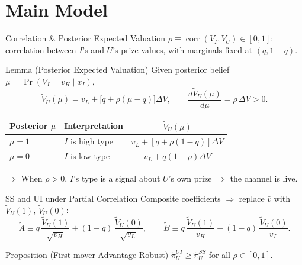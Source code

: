 \documentclass[aspectratio=169, 12pt]{beamer}
\newcommand{\VU}{\widetilde V_U}
\begin{document}
\section{Main Model}

\begin{frame}{Correlation \& Posterior Expected Valuation}
  $\rho \equiv \operatorname{corr}(V_I, V_U) \in [0,1]$: correlation between
  $I$'s and $U$'s prize values, with marginals fixed at $(q, 1-q)$.

  \begin{block}{Lemma (Posterior Expected Valuation)}
    Given posterior belief $\mu = \Pr(V_I = v_H \mid x_I)$,
    \[
      \VU(\mu) = v_L + \bigl[q + \rho(\mu - q)\bigr]\Delta V,
      \qquad
      \frac{d\VU(\mu)}{d\mu} = \rho\,\Delta V > 0.
    \]
  \end{block}

  \begin{center}
    \footnotesize
    \begin{tabular}{@{}llc@{}}
      \toprule
      Posterior $\mu$ & Interpretation & $\VU(\mu)$ \\
      \midrule
      $\mu = 1$ & $I$ is high type & $v_L + [q+\rho(1-q)]\Delta V$ \\
      $\mu = 0$ & $I$ is low type & $v_L + q(1-\rho)\Delta V$ \\
      \bottomrule
    \end{tabular}
  \end{center}

  $\Rightarrow$ When $\rho > 0$, $I$'s type is a signal about $U$'s own prize
  $\Rightarrow$ the channel is live.
\end{frame}

\begin{frame}{SS and UI under Partial Correlation}
  Composite coefficients $\Rightarrow$ replace $\bar v$ with $\VU(1)$, $\VU(0)$:
  \[
    \tilde A \equiv q\,\frac{\VU(1)}{\sqrt{v_H}}
      + (1-q)\,\frac{\VU(0)}{\sqrt{v_L}},
    \qquad
    \tilde B \equiv q\,\frac{\VU(1)}{v_H}
      + (1-q)\,\frac{\VU(0)}{v_L}.
  \]

  \begin{block}{Proposition (First-mover Advantage Robust)}
    $\widetilde\pi_U^{UI} \ge \widetilde\pi_U^{SS}$ for all $\rho \in [0,1]$.
  \end{block}
\end{frame}
\end{document}
